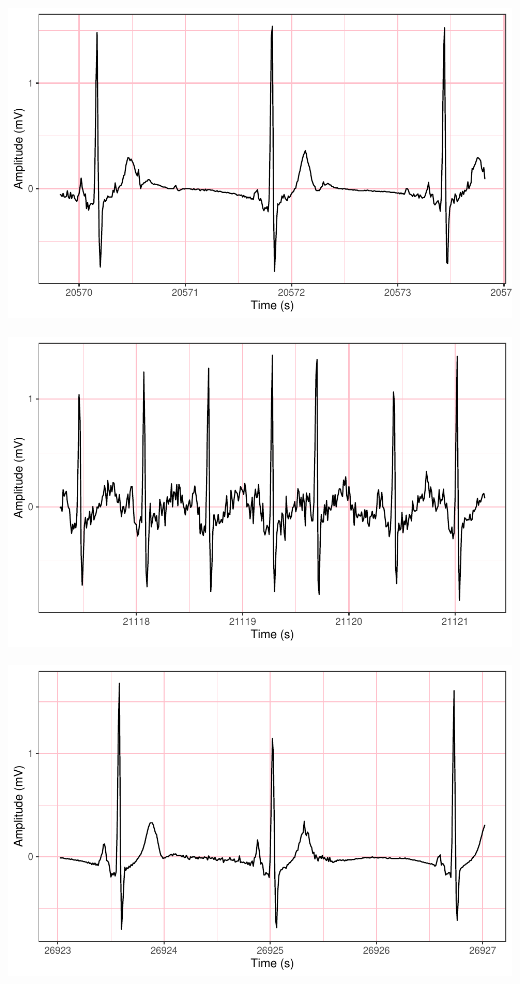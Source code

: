 \documentclass[
]{article}
\begin{document}
\begin{center}\includegraphics{report_files/figure-latex/abnormal-interval-51} \end{center}

\begin{center}\includegraphics{report_files/figure-latex/abnormal-interval-52} \end{center}

\begin{center}\includegraphics{report_files/figure-latex/abnormal-interval-53} \end{center}
\end{document}
